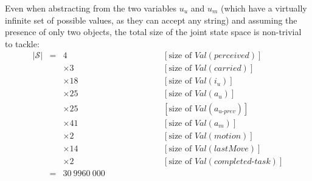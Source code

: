 Even when abstracting from the two variables $u_u$ and $u_m$ (which have a virtually infinite set of possible values, as they can accept any string) and assuming the presence of only two objects, the total size of the joint state space is non-trivial to tackle: 
\begin{align}
|\mathcal{S}| & = & 4 \ \ \ \ \ \ \ \ \ \ &&& \ \ \ \ \ \ \ \ \ \ [\text{size of } Val(\mathit{perceived})] \nonumber \\
 && \times 3 \ \ \ \ \ \ \ \ \ \ &&&  \ \ \ \ \ \ \ \ \ \ [\text{size of } Val(carried)] \nonumber \\
 && \times 18 \ \ \ \ \ \ \ \ \ \ &&&\ \ \ \ \ \ \ \ \ \  [\text{size of } Val(i_u)] \nonumber \\
&&  \times 25 \ \ \ \ \ \ \ \ \ \ &&&\ \ \ \ \ \ \ \ \ \  [\text{size of } Val(a_u)] \nonumber \\
&&  \times 25 \ \ \ \ \ \ \ \ \ \ &&&\ \ \ \ \ \ \ \ \ \  [\text{size of } Val(a_{u\mbox{-}prev})] \nonumber \\
&&  \times 41 \ \ \ \ \ \ \ \ \ \ &&&\ \ \ \ \ \ \ \ \ \  [\text{size of } Val(a_m)] \nonumber \\
&&  \times 2 \ \ \ \ \ \ \ \ \ \ &&&\ \ \ \ \ \ \ \ \ \  [\text{size of } Val(\mathit{motion})] \nonumber \\
&&  \times 14 \ \ \ \ \ \ \ \ \ \ &&&\ \ \ \ \ \ \ \ \ \  [\text{size of } Val(\mathit{lastMove})] \nonumber \\
&&  \times 2 \ \ \ \ \ \ \ \ \ \ &&&\ \ \ \ \ \ \ \ \ \  [\text{size of } Val(\mathit{completed\mbox{-}task})] \nonumber \\
 & =  & \!\!\!\!\!\!\!\!\!\! 30 \ 9960 \ 000 \ \ \ \ \ \ \ \ \ \ &&&\ \ \ \ \ \ \ \ \ \ \nonumber 
  \end{align}
 
